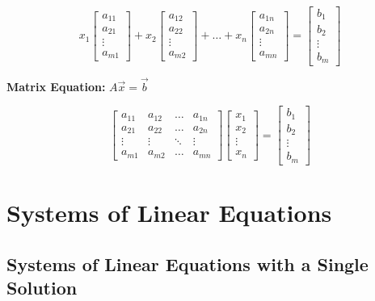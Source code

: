 \documentclass[
  letterpaper,
  DIV=11,
  numbers=noendperiod]{scrreprt}
\begin{document}
\[
x_1
\begin{bmatrix}
a_{11}\\
a_{21}\\
\vdots\\
a_{m1}
\end{bmatrix} +
x_2
\begin{bmatrix}
a_{12}\\
a_{22}\\
\vdots\\
a_{m2}
\end{bmatrix}+
\dots +
x_n
\begin{bmatrix}
a_{1n}\\
a_{2n}\\
\vdots\\
a_{mn}
\end{bmatrix} = 
\begin{bmatrix}
b_1\\
b_2\\
\vdots\\
b_m
\end{bmatrix}
\]

\textbf{Matrix Equation:} \(A\vec{x}=\vec{b}\)

\[
\begin{bmatrix}
a_{11} & a_{12} & \dots & a_{1n} \\
a_{21} & a_{22} & \dots & a_{2n} \\
\vdots & \vdots & \ddots & \vdots \\
a_{m1} & a_{m2} & \dots & a_{mn}
\end{bmatrix} 
\begin{bmatrix}
x_1 \\ 
x_2 \\ 
\vdots \\ 
x_n
\end{bmatrix}=
\begin{bmatrix}
b_1 \\ b_2 \\ \vdots \\ b_m
\end{bmatrix}
\]


\hypertarget{systems-of-linear-equations}{%
\chapter{Systems of Linear
Equations}\label{systems-of-linear-equations}}

\hypertarget{systems-of-linear-equations-with-a-single-solution}{%
\section{Systems of Linear Equations with a Single
Solution}\label{systems-of-linear-equations-with-a-single-solution}}
\end{document}

